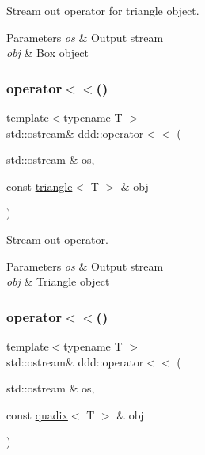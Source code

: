 Stream out operator for triangle object. 


\begin{DoxyParams}{Parameters}
{\em os} & Output stream \\
\hline
{\em obj} & Box object \\
\hline
\end{DoxyParams}
\mbox{\label{namespaceddd_a3a6f828f85e4fa306f0d950f1aab4f64}} 
\subsubsection{\texorpdfstring{operator$<$$<$()}{operator<<()}\hspace{0.1cm}{\footnotesize\ttfamily [8/10]}}
{\footnotesize\ttfamily template$<$typename T $>$ \\
std\+::ostream\& ddd\+::operator$<$$<$ (\begin{DoxyParamCaption}\item[{std\+::ostream \&}]{os,  }\item[{const \hyperlink{classddd_1_1triangle}{triangle}$<$ T $>$ \&}]{obj }\end{DoxyParamCaption})\hspace{0.3cm}{\ttfamily [inline]}}



Stream out operator. 


\begin{DoxyParams}{Parameters}
{\em os} & Output stream \\
\hline
{\em obj} & Triangle object \\
\hline
\end{DoxyParams}
\mbox{\label{namespaceddd_a58ae88cefdf3b919e400db6de59f4cfc}} 
\subsubsection{\texorpdfstring{operator$<$$<$()}{operator<<()}\hspace{0.1cm}{\footnotesize\ttfamily [9/10]}}
{\footnotesize\ttfamily template$<$typename T $>$ \\
std\+::ostream\& ddd\+::operator$<$$<$ (\begin{DoxyParamCaption}\item[{std\+::ostream \&}]{os,  }\item[{const \hyperlink{classddd_1_1quadix}{quadix}$<$ T $>$ \&}]{obj }\end{DoxyParamCaption})\hspace{0.3cm}{\ttfamily [inline]}}


